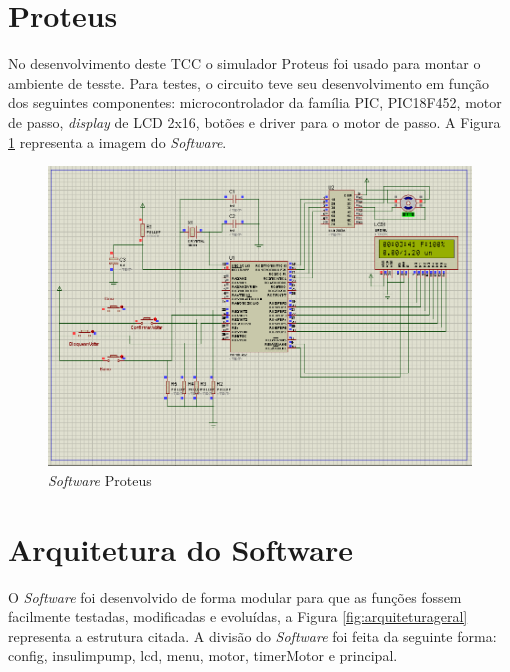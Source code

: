 \section{Proteus}

No desenvolvimento deste TCC o simulador Proteus foi usado para montar o ambiente de tesste. Para testes, o circuito teve seu desenvolvimento em função dos seguintes componentes: microcontrolador da família PIC, PIC18F452, motor de passo, \emph{display} de LCD 2x16, botões e driver para o motor de passo. A Figura \ref{fig:proteus} representa a imagem do \emph{Software}.

\begin{figure}[htp]
	\centering
	\includegraphics[scale=0.5]{images/proteus.png}
	\caption{\emph{Software} Proteus}	
	\label{fig:proteus}
\end{figure}

\section{Arquitetura do Software}

O \emph{Software} foi desenvolvido de forma modular para que as funções fossem facilmente testadas, modificadas e evoluídas, a Figura \ref{fig:arquiteturageral} representa a estrutura citada. A divisão do \emph{Software} foi feita da seguinte forma: config, insulimpump, lcd, menu, motor, timerMotor e principal. 

